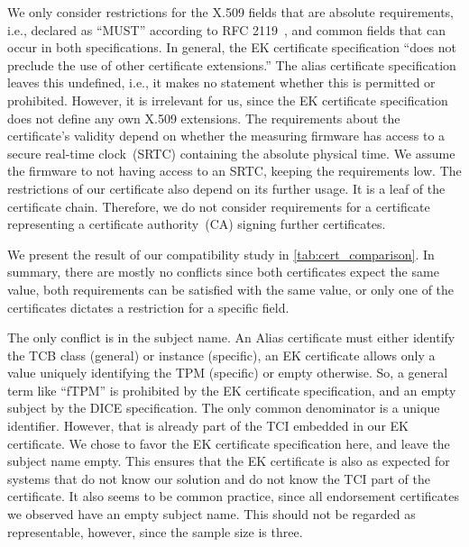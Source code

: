 We only consider restrictions for the X.509 fields that are absolute requirements, i.e., declared as ``MUST'' according to RFC 2119~\cite{Bradner1997}, and common fields that can occur in both specifications.
In general, the EK certificate specification ``does not preclude the use of other certificate extensions.''
The alias certificate specification leaves this undefined, i.e., it makes no statement whether this is permitted or prohibited.
However, it is irrelevant for us, since the EK certificate specification does not define any own X.509 extensions.
The requirements about the certificate's validity depend on whether the measuring firmware has access to a secure real-time clock~(SRTC) containing the absolute physical time.
We assume the firmware to not having access to an SRTC, keeping the requirements low.
The restrictions of our certificate also depend on its further usage.
It is a leaf of the certificate chain.
Therefore, we do not consider requirements for a certificate representing a certificate authority~(CA) signing further certificates.

We present the result of our compatibility study in \autoref{tab:cert_comparison}.
In summary, there are mostly no conflicts since both certificates expect the same value, both requirements can be satisfied with the same value, or only one of the certificates dictates a restriction for a specific field.



The only conflict is in the subject name.
An Alias certificate must either identify the TCB class (general) or instance (specific), an EK certificate allows only a value uniquely identifying the TPM (specific) or empty otherwise.
So, a general term like ``fTPM'' is prohibited by the EK certificate specification, and an empty subject by the DICE specification.
The only common denominator is a unique identifier.
However, that is already part of the TCI embedded in our EK certificate.
We chose to favor the EK certificate specification here, and leave the subject name empty.
This ensures that the EK certificate is also as expected for systems that do not know our solution and do not know the TCI part of the certificate.
It also seems to be common practice, since all endorsement certificates we observed have an empty subject name.
This should not be regarded as representable, however, since the sample size is three.

